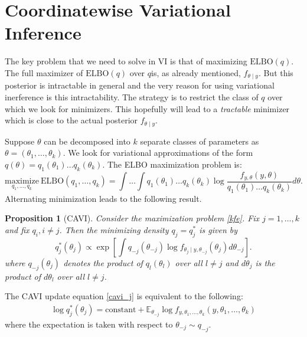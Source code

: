 \documentclass{scrartcl}
\newtheorem{proposition}[theorem]{Proposition}
\newcommand{\E}{{\mathbb E}}
\begin{document}
\section{Coordinatewise Variational Inference}

The key problem that we need to solve in VI is that of maximizing
$\text{ELBO}(q)$. The full maximizer of $\text{ELBO}(q)$ over $q$is, 
as already mentioned, $f_{\theta \mid y}$. But this posterior
is intractable in general and the very reason for using variational
inerference is this intractability. The strategy is to restrict the class
of $q$ over which we look for minimizers. This hopefully will lead to
a \textit{tractable} minimizer which is close to the actual posterior
$f_{\theta \mid y}$.

Suppose $\theta$ can be decomposed into $k$ separate classes of
parameters as $\theta = (\theta_1, \dots, \theta_k)$. We look for
variational approximations of the form $q(\theta) = q_1(\theta_1)
\dots q_k(\theta_k)$. The ELBO maximization problem is:
\begin{equation}\label{kfe}
  \underset{q_1, \dots, q_k}{\text{maximize}}~ \text{ELBO}(q_1, \dots,
  q_k) = \int \dots \int 
  q_1(\theta_1) \dots q_k(\theta_k) \log \frac{f_{y, \theta}(y, \theta)}{q_1(\theta_1) \dots
    q_k(\theta_k)} d\theta.    
\end{equation}
Alternating minimization leads to the following result. 

\begin{proposition}[CAVI]\label{cavi}
  Consider the maximization problem \eqref{kfe}. Fix $j = 1,
  \dots, k$ and fix $q_i, i \neq j$. Then the minimizing density $q_j
  = q_j^*$ is given by
  \begin{equation}
    \label{cavi_j}
    q_j^*(\theta_j) \propto \exp \left[\int q_{-j}(\theta_{-j}) \log
      f_{\theta_j \mid y, \theta_{-j}}(\theta_j) d\theta_{-j}
    \right]. 
  \end{equation}
  where $q_{-j}(\theta_j)$ denotes the product of $q_{l}(\theta_l)$
  over all $l \neq j$ and $d\theta_j$ is the product of $d\theta_l$
  over all $l \neq j$. 
\end{proposition}
The CAVI update equation \eqref{cavi_j} is equivalent to the following:
\begin{align}\label{cavi_log}
  \log q_j^*(\theta_j) = \text{constant} + \E_{\theta_{-j}} \log f_{y,
  \theta_1, \dots, \theta_k}(y, \theta_1, \dots, \theta_k)
\end{align}
where the expectation is taken with respect to $\theta_{-j} \sim
q_{-j}$. 
\end{document}
